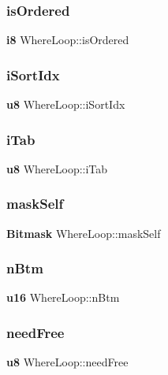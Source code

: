 \subsubsection{isOrdered}
{\footnotesize\ttfamily \textbf{ i8} Where\+Loop\+::is\+Ordered}

\mbox{\label{struct_where_loop_a35e725c988b2bcfb9633a259cd6eba58}} 
\subsubsection{iSortIdx}
{\footnotesize\ttfamily \textbf{ u8} Where\+Loop\+::i\+Sort\+Idx}

\mbox{\label{struct_where_loop_a469ad31ae7f3b025667813e2d0aa9d01}} 
\subsubsection{iTab}
{\footnotesize\ttfamily \textbf{ u8} Where\+Loop\+::i\+Tab}

\mbox{\label{struct_where_loop_a0118b20be771241ee29de452ffead61e}} 
\subsubsection{maskSelf}
{\footnotesize\ttfamily \textbf{ Bitmask} Where\+Loop\+::mask\+Self}

\mbox{\label{struct_where_loop_a4badc4b8c0d1a8ff75d11832acce2805}} 
\subsubsection{nBtm}
{\footnotesize\ttfamily \textbf{ u16} Where\+Loop\+::n\+Btm}

\mbox{\label{struct_where_loop_aac0594e38ca4710a0d98039225680b82}} 
\subsubsection{needFree}
{\footnotesize\ttfamily \textbf{ u8} Where\+Loop\+::need\+Free}

\mbox{\label{struct_where_loop_a6472a46f9fdb5704c9c2afebfbf6d5a6}} 
